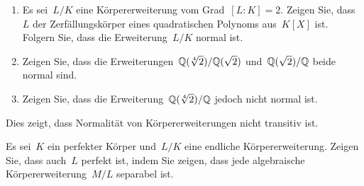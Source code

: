 \documentclass{scrartcl}
\begin{document}
\begin{exercise}
  \begin{enumerate}
    \item
      Es sei~$L/K$ eine Körpererweiterung vom Grad~$[L : K] = 2$.
      Zeigen Sie, dass~$L$ der Zerfällungskörper eines quadratischen Polynoms aus~$K[X]$ ist.
      Folgern Sie, dass die Erweiterung~$L/K$ normal ist.
    \item
      Zeigen Sie, dass die Erweiterungen~$\mathbb{Q}(\sqrt[4]{2}) / \mathbb{Q}(\sqrt{2})$ und~$\mathbb{Q}(\sqrt{2}) / \mathbb{Q}$ beide normal sind.
    \item
      Zeigen Sie, dass die Erweiterung~$\mathbb{Q}(\sqrt[4]{2}) / \mathbb{Q}$ jedoch nicht normal ist.
  \end{enumerate}
  Dies zeigt, dass Normalität von Körpererweiterungen nicht transitiv ist.
\end{exercise}

\begin{exercise}
  Es sei~$K$ ein perfekter Körper und~$L/K$ eine endliche Körpererweiterung.
  Zeigen Sie, dass auch~$L$ perfekt ist, indem Sie zeigen, dass jede algebraische Körpererweiterung~$M/L$ separabel ist.
\end{exercise}
\end{document}
